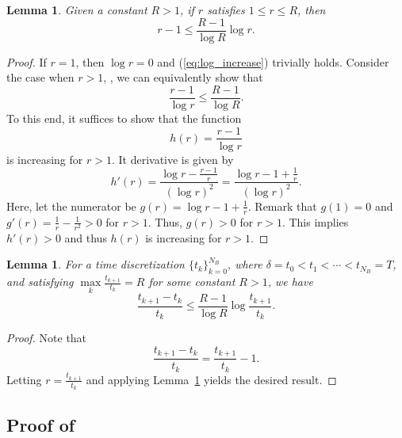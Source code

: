 \documentclass{article} %
\newtheorem{lemma}[theorem]{Lemma}
\def\eqref#1{equation~\ref{#1}}
\renewcommand{\eqref}[1]{\textup{(\ref{#1})}}
\begin{document}
\begin{lemma}\label{lemma:log_increase}
Given a constant $R > 1$, if $r$ satisfies $1 \leq r \leq R$, then
    \begin{equation}\label{eq:log_increase}
    r-1 \leq \frac{R-1}{\log R} \log r.
    \end{equation}
\end{lemma}

\begin{proof}
    If $r=1$, then $\log r=0$ and \eqref{eq:log_increase} trivially holds.
    Consider the case when $r>1$, , we can equivalently show that 
    \[
    \frac{r-1}{\log r} \leq \frac{R-1}{\log R}.
    \]
    To this end, it suffices to show that the function
    \[
    h(r) = \frac{r-1}{\log r}
    \]
    is increasing for $r>1$. It derivative is given by
    \begin{equation}
        h'(r) = \frac{\log r - \frac{r-1}{r}}{(\log r)^2} = \frac{\log r - 1 + \frac{1}{r}}{(\log r)^2}.
    \end{equation}
    Here, let the numerator be $g(r) = \log r - 1 + \frac{1}{r}$. Remark that $g(1)=0$ and $g'(r)=\frac{1}{r}-\frac{1}{r^2}>0$ for $r>1$. Thus, $g(r)>0$ for $r>1$. This implies $h'(r)>0$ and thus $h(r)$ is increasing for $r>1$. 
\end{proof}

\begin{lemma}\label{lemma:time_ratio_bound}
    For a time discretization $\{ t_k\}_{k=0}^{N_B}$, where $\delta=t_0 < t_1 < \cdots < t_{N_B}=T$,
     and satisfying $\max\limits_k \frac{t_{k+1}}{t_k} = R$ for some constant $R>1$, we have
    \begin{equation}
        \frac{t_{k+1}-t_k}{t_k} \leq \frac{R-1}{\log R} \log\frac{t_{k+1}}{t_k}.
    \end{equation}
\end{lemma}

\begin{proof}
    Note that 
    \[
    \frac{t_{k+1}-t_k}{t_k} = \frac{t_{k+1}}{t_k} - 1.
    \]
    Letting $r=\frac{t_{k+1}}{t_k}$ and applying Lemma~\ref{lemma:log_increase} yields the desired result.
\end{proof}

\subsection{Proof of \texorpdfstring{}{Corollary \ref*{cor:StepComplexity}}}
\corStepComplexity*
\end{document}
